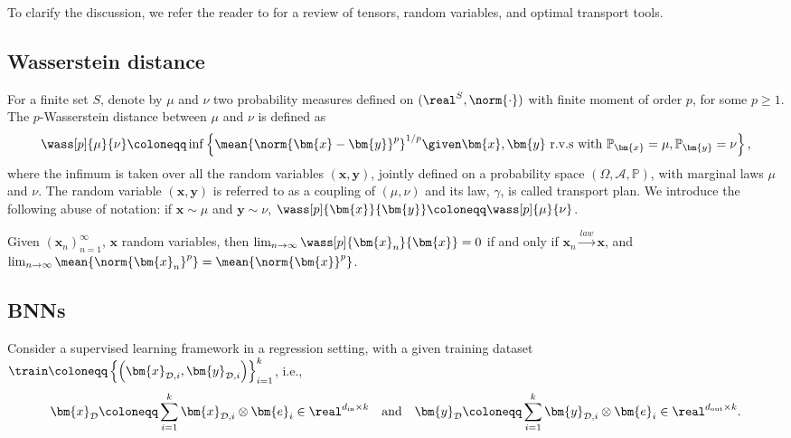 To clarify the discussion, we refer the reader to  for a review of tensors, random variables, and optimal transport tools.

\subsection{Wasserstein distance}

For a finite set $S$, denote by $\mu$ and $\nu$ two probability measures defined on $(\real^S, \norm{\cdot})$ with finite moment of order $p$, for some $p \geq 1$. The $p$-Wasserstein distance between $\mu$ and $\nu$ is defined as
\begin{equation*}
    \wass[p]{\mu}{\nu} \coloneqq \inf\left\{\mean{\norm{\bm{x} - \bm{y}}^p}^{1/p} \given \bm{x}, \bm{y} \text{ r.v.s with } \mathbb{P}_{\bm{x}} = \mu, \mathbb{P}_{\bm{y}} = \nu\right\},
\end{equation*}
where the infimum is taken over all the random variables $(\bm{x}, \bm{y})$, jointly defined on a probability space $(\Omega, \mathcal{A}, \mathbb{P})$, with marginal laws $\mu$ and $\nu$. 
The random variable $(\bm{x}, \bm{y})$ is referred to as a coupling of $(\mu, \nu)$ and its law, $\gamma$, is called transport plan. We introduce the following abuse of notation: if $\bm{x} \sim \mu$ and $\bm{y} \sim \nu$, $\wass[p]{\bm{x}}{\bm{y}} \coloneqq \wass[p]{\mu}{\nu}$. 

\begin{theorem} \label{thm:wassdist}
    Given $(\bm{x}_n)_{n = 1}^{\infty}$, $\bm{x}$ random variables, then $\lim_{n \to \infty} \wass[p]{\bm{x}_n}{\bm{x}} = 0$ if and only if $\bm{x}_n \xrightarrow{law} \bm{x}$, and $\lim_{n \to \infty} \mean{\norm{\bm{x}_n}^p} = \mean{\norm{\bm{x}}^p}$.
\end{theorem}

\subsection{BNNs}

Consider a supervised learning framework in a regression setting, with a given training dataset $\train \coloneqq \left\{\left(\bm{x}_{\mathcal{D}, i}, \bm{y}_{\mathcal{D}, i}\right)\right\}_{i = 1}^k$, i.e.,
\begin{equation*}
    \bm{x}_{\mathcal{D}} \coloneqq \sum_{i = 1}^k \bm{x}_{\mathcal{D}, i} \otimes \bm{e}_i \in \real^{d_{\mathrm{in}} \times k} \quad \text{and} \quad
    \bm{y}_{\mathcal{D}} \coloneqq \sum_{i = 1}^k \bm{y}_{\mathcal{D}, i} \otimes \bm{e}_i \in \real^{d_{\mathrm{out}} \times k}.
\end{equation*}

